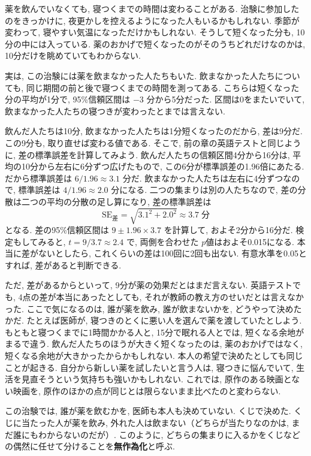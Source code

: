     薬を飲んでいなくても, 寝つくまでの時間は変わることがある.
    治験に参加したのをきっかけに, 夜更かしを控えるようになった人もいるかもしれない.
    季節が変わって, 寝やすい気温になっただけかもしれない.
    そうして短くなった分も, 10分の中には入っている.
    薬のおかげで短くなったのがそのうちどれだけなのかは, 10分だけを眺めていてもわからない.

    実は, この治験には薬を飲まなかった人たちもいた.
    飲まなかった人たちについても, 同じ期間の前と後で寝つくまでの時間を測ってある.
    こちらは短くなった分の平均が1分で, 95\%信頼区間は $-3$ 分から5分だった.
    区間は0をまたいでいて, 飲まなかった人たちの寝つきが変わったとまでは言えない.

    飲んだ人たちは10分, 飲まなかった人たちは1分短くなったのだから, 差は9分だ.
    この9分も, 取り直せば変わる値である.
    そこで, 前の章の英語テストと同じように, 差の標準誤差を計算してみよう.
    飲んだ人たちの信頼区間4分から16分は, 平均の10分から左右に6分ずつ広げたもので, この6分が標準誤差の1.96倍にあたる.
    だから標準誤差は $6 / 1.96 \approx 3.1$ 分だ.
    飲まなかった人たちは左右に4分ずつなので, 標準誤差は $4 / 1.96 \approx 2.0$ 分になる.
    二つの集まりは別の人たちなので, 差の分散は二つの平均の分散の足し算になり, 差の標準誤差は
    \[
      \mathrm{SE}_{\text{差}} = \sqrt{3.1^2 + 2.0^2} \approx 3.7\;\text{分}
    \]
    となる.
    差の95\%信頼区間は $9 \pm 1.96 \times 3.7$ を計算して, およそ2分から16分だ.
    検定もしてみると, $t = 9 / 3.7 \approx 2.4$ で, 両側を合わせた $p$値はおよそ0.015になる.
    本当に差がないとしたら, これくらいの差は100回に2回も出ない.
    有意水準を0.05とすれば, 差があると判断できる.

    ただ, 差があるからといって, 9分が薬の効果だとはまだ言えない.
    英語テストでも, 4点の差が本当にあったとしても, それが教師の教え方のせいだとは言えなかった.
    ここで気になるのは, 誰が薬を飲み, 誰が飲まないかを, どうやって決めたかだ.
    たとえば医師が, 寝つきのとくに悪い人を選んで薬を渡していたとしよう.
    もともと寝つくまでに1時間かかる人と, 15分で眠れる人とでは, 短くなる余地がまるで違う.
    飲んだ人たちのほうが大きく短くなったのは, 薬のおかげではなく, 短くなる余地が大きかったからかもしれない.
    本人の希望で決めたとしても同じことが起きる.
    自分から新しい薬を試したいと言う人は, 寝つきに悩んでいて, 生活を見直そうという気持ちも強いかもしれない.
    これでは, 原作のある映画とない映画を, 原作のほかの点が同じとは限らないまま比べたのと変わらない.

    この治験では, 誰が薬を飲むかを, 医師も本人も決めていない.
    くじで決めた.
    くじに当たった人が薬を飲み, 外れた人は飲まない（どちらが当たりなのかは, まだ誰にもわからないのだが）.
    このように, どちらの集まりに入るかをくじなどの偶然に任せて分けることを\textbf{無作為化}と呼ぶ.

